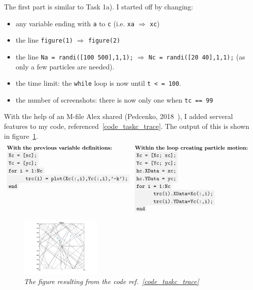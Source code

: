 \documentclass[10pt,a4paper]{article}
\newcommand{\code}[1]{\colorbox{light-gray}{\texttt{#1}}}
\begin{document}
	The first part is similar to Task 1a). I started off by changing: 
	\begin{itemize}
		\item any variable ending with \code{a} to \code{c} (i.e. \code{xa} $\Rightarrow$ \code{xc})
		\item the line \code{figure(1)} $\Rightarrow $ \code{figure(2)}
		\item the line \code{Na = randi([100 500],1,1);}  $\Rightarrow $ \code{Nc = randi([20 40],1,1);} (as only a few particles are needed).
		\item the time limit: the \code{while} loop is now until \code{t < = 100}.
		\item the number of screenshots: there is now only one when \code{tc == 99}
	\end{itemize}
	With the help of an M-file Alex shared (Pedcenko, 2018~\cite{MatlabTraceExample}), I added serveral features to my code, referenced~\ref{code_taskc_trace}. The output of this is shown in figure~\ref{fig_tracephoto}. 
	\begin{equation} %
	\label{code_taskc_trace}
	\begin{array}{ll}
	\text{\textbf{With the previous variable definitions: }}	
	& \text{\textbf{Within the loop creating particle motion: }}\\
	\code{Xc = [xc];}		& \code{Xc = [Xc; xc];} \\
	\code{Yc = [yc];}		& \code{Yc = [Yc; yc];} \\ 
	\code{for i = 1:Nc}		& \code{hc.XData = xc;}\\
	\code{\ \ \ \ \ \ trc(i) = plot(Xc(:,i),Yc(:,i),'-k');}	&	\code{hc.YData = yc;}\\
	\code{end}&	\code{for i = 1:Nc}\\
	&\code{\ \ \ \ \ \ trc(i).XData=Xc(:,i);}\\
	&\code{\ \ \ \ \ \ trc(i).YData=Yc(:,i);}\\
	&  \code{end}
	\end{array}
	\end{equation}
	\begin{figure}[h!] %
		\begin{center}
		\includegraphics[width=0.35\textwidth]{screenshot_taskc.png}
		\caption{\textit{\label{fig_tracephoto}The figure resulting from the code ref.~\ref{code_taskc_trace}}}
		\end{center}
	\end{figure}
	
\end{document}
